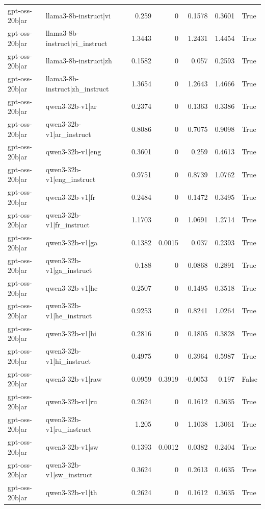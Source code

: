 \begin{table}
\begin{tabular}{l l r r r r l}
gpt-oss-20b|ar & llama3-8b-instruct|vi & 0.259 & 0 & 0.1578 & 0.3601 & True \\
gpt-oss-20b|ar & llama3-8b-instruct|vi_instruct & 1.3443 & 0 & 1.2431 & 1.4454 & True \\
gpt-oss-20b|ar & llama3-8b-instruct|zh & 0.1582 & 0 & 0.057 & 0.2593 & True \\
gpt-oss-20b|ar & llama3-8b-instruct|zh_instruct & 1.3654 & 0 & 1.2643 & 1.4666 & True \\
gpt-oss-20b|ar & qwen3-32b-v1|ar & 0.2374 & 0 & 0.1363 & 0.3386 & True \\
gpt-oss-20b|ar & qwen3-32b-v1|ar_instruct & 0.8086 & 0 & 0.7075 & 0.9098 & True \\
gpt-oss-20b|ar & qwen3-32b-v1|eng & 0.3601 & 0 & 0.259 & 0.4613 & True \\
gpt-oss-20b|ar & qwen3-32b-v1|eng_instruct & 0.9751 & 0 & 0.8739 & 1.0762 & True \\
gpt-oss-20b|ar & qwen3-32b-v1|fr & 0.2484 & 0 & 0.1472 & 0.3495 & True \\
gpt-oss-20b|ar & qwen3-32b-v1|fr_instruct & 1.1703 & 0 & 1.0691 & 1.2714 & True \\
gpt-oss-20b|ar & qwen3-32b-v1|ga & 0.1382 & 0.0015 & 0.037 & 0.2393 & True \\
gpt-oss-20b|ar & qwen3-32b-v1|ga_instruct & 0.188 & 0 & 0.0868 & 0.2891 & True \\
gpt-oss-20b|ar & qwen3-32b-v1|he & 0.2507 & 0 & 0.1495 & 0.3518 & True \\
gpt-oss-20b|ar & qwen3-32b-v1|he_instruct & 0.9253 & 0 & 0.8241 & 1.0264 & True \\
gpt-oss-20b|ar & qwen3-32b-v1|hi & 0.2816 & 0 & 0.1805 & 0.3828 & True \\
gpt-oss-20b|ar & qwen3-32b-v1|hi_instruct & 0.4975 & 0 & 0.3964 & 0.5987 & True \\
gpt-oss-20b|ar & qwen3-32b-v1|raw & 0.0959 & 0.3919 & -0.0053 & 0.197 & False \\
gpt-oss-20b|ar & qwen3-32b-v1|ru & 0.2624 & 0 & 0.1612 & 0.3635 & True \\
gpt-oss-20b|ar & qwen3-32b-v1|ru_instruct & 1.205 & 0 & 1.1038 & 1.3061 & True \\
gpt-oss-20b|ar & qwen3-32b-v1|sw & 0.1393 & 0.0012 & 0.0382 & 0.2404 & True \\
gpt-oss-20b|ar & qwen3-32b-v1|sw_instruct & 0.3624 & 0 & 0.2613 & 0.4635 & True \\
gpt-oss-20b|ar & qwen3-32b-v1|th & 0.2624 & 0 & 0.1612 & 0.3635 & True \\

\end{tabular}
\end{table}
